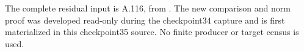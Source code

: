 \begingroup\footnotesize\raggedright
The complete residual input is A.116, from
.
The new comparison and norm proof was developed read-only during
the checkpoint34 capture and is first materialized in this
checkpoint35 source. No finite producer or target census is used.
\par\endgroup
